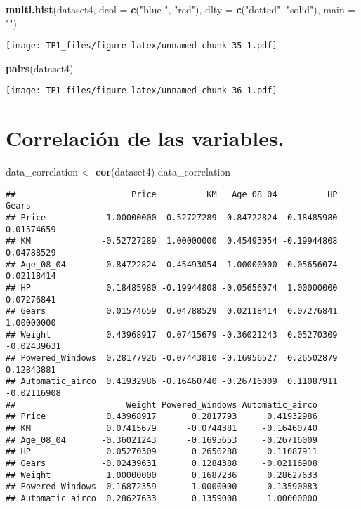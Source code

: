 \documentclass[
]{article}
\newenvironment{Shaded}{\begin{snugshade}}{\end{snugshade}}
\newcommand{\DataTypeTok}[1]{\textcolor[rgb]{0.13,0.29,0.53}{#1}}
\newcommand{\KeywordTok}[1]{\textcolor[rgb]{0.13,0.29,0.53}{\textbf{#1}}}
\newcommand{\NormalTok}[1]{#1}
\newcommand{\StringTok}[1]{\textcolor[rgb]{0.31,0.60,0.02}{#1}}
\begin{document}
\begin{Shaded}
\begin{Highlighting}[]
\KeywordTok{multi.hist}\NormalTok{(dataset4, }\DataTypeTok{dcol =} \KeywordTok{c}\NormalTok{(}\StringTok{"blue "}\NormalTok{, }\StringTok{"red"}\NormalTok{), }\DataTypeTok{dlty =} \KeywordTok{c}\NormalTok{(}\StringTok{"dotted"}\NormalTok{, }\StringTok{"solid"}\NormalTok{), }\DataTypeTok{main =} \StringTok{""}\NormalTok{)}
\end{Highlighting}
\end{Shaded}

\texttt{[image: TP1\_files/figure-latex/unnamed-chunk-35-1.pdf]}

\begin{Shaded}
\begin{Highlighting}[]
\KeywordTok{pairs}\NormalTok{(dataset4)}
\end{Highlighting}
\end{Shaded}

\texttt{[image: TP1\_files/figure-latex/unnamed-chunk-36-1.pdf]}

\hypertarget{correlaciuxf3n-de-las-variables.}{%
\section{Correlación de las
variables.}\label{correlaciuxf3n-de-las-variables.}}

\begin{Shaded}
\begin{Highlighting}[]
\NormalTok{data_correlation <-}\StringTok{ }\KeywordTok{cor}\NormalTok{(dataset4)}
\NormalTok{data_correlation}
\end{Highlighting}
\end{Shaded}

\begin{verbatim}
##                       Price          KM   Age_08_04          HP       Gears
## Price            1.00000000 -0.52727289 -0.84722824  0.18485980  0.01574659
## KM              -0.52727289  1.00000000  0.45493054 -0.19944808  0.04788529
## Age_08_04       -0.84722824  0.45493054  1.00000000 -0.05656074  0.02118414
## HP               0.18485980 -0.19944808 -0.05656074  1.00000000  0.07276841
## Gears            0.01574659  0.04788529  0.02118414  0.07276841  1.00000000
## Weight           0.43968917  0.07415679 -0.36021243  0.05270309 -0.02439631
## Powered_Windows  0.28177926 -0.07443810 -0.16956527  0.26502879  0.12843881
## Automatic_airco  0.41932986 -0.16460740 -0.26716009  0.11087911 -0.02116908
##                      Weight Powered_Windows Automatic_airco
## Price            0.43968917       0.2817793      0.41932986
## KM               0.07415679      -0.0744381     -0.16460740
## Age_08_04       -0.36021243      -0.1695653     -0.26716009
## HP               0.05270309       0.2650288      0.11087911
## Gears           -0.02439631       0.1284388     -0.02116908
## Weight           1.00000000       0.1687236      0.28627633
## Powered_Windows  0.16872359       1.0000000      0.13590083
## Automatic_airco  0.28627633       0.1359008      1.00000000
\end{verbatim}
\end{document}
